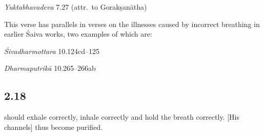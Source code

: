 \begin{ekdosis}
\begin{testimonia}[hp02_017]
\begin{versinnote}
\end{versinnote}

\emph{Yuktabhavadeva} 7.27 (attr.~to Gorakṣanātha)
\begin{versinnote}
\end{versinnote}

\end{testimonia}

\begin{philcomm}[hp02_017]
This verse has parallels in verses on the illnesses caused by incorrect breathing in earlier Śaiva works, two examples of which are:

\emph{Śivadharmottara} 10.124cd–125
\begin{versinnote}
\end{versinnote}

\emph{Dharmaputrikā} 10.265–266ab
\begin{versinnote}
\end{versinnote}

\end{philcomm}


\subsection*{2.18}
\begin{translation} should exhale correctly, inhale correctly and hold the breath correctly. [His channels] thus become purified.
\end{translation}


\end{ekdosis}
